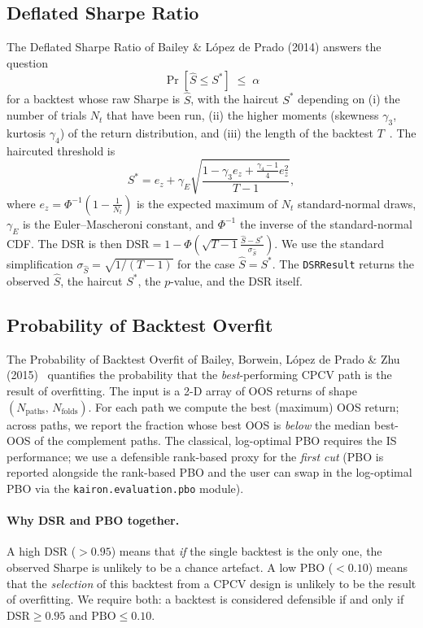 \documentclass[11pt,a4paper]{article}
\providecommand{\sharpehat}{\hat{S}}
\providecommand{\srmin}{S^{\ast}}
\begin{document}
\subsection{Deflated Sharpe Ratio}
The Deflated Sharpe Ratio of Bailey \& López de Prado (2014)
answers the question
\[
\Pr\!\left[\sharpehat \leq \srmin\right]\; \leq\; \alpha
\]
for a backtest whose raw Sharpe is $\sharpehat$, with the
haircut $\srmin$ depending on (i) the number of trials $N_t$
that have been run, (ii) the higher moments (skewness
$\gamma_3$, kurtosis $\gamma_4$) of the return
distribution, and (iii) the length of the backtest
$T$~\cite{bailey2014deflated}. The haircuted threshold is
\begin{equation}\label{eq:srstar}
\srmin = e_{z} + \gamma_E\sqrt{
\frac{
1 - \gamma_3 e_z + \frac{\gamma_4-1}{4}e_z^2
}{T-1}
},
\end{equation}
where $e_z = \Phi^{-1}\!\left(1-\frac{1}{N_t}\right)$ is the
expected maximum of $N_t$ standard-normal draws, $\gamma_E$
is the Euler--Mascheroni constant, and $\Phi^{-1}$ the
inverse of the standard-normal CDF. The DSR is then
$\mathrm{DSR} = 1 - \Phi\!\left(
\sqrt{T-1}\frac{\sharpehat - \srmin}{\sigma_{\sharpehat}}
\right)$. We use the standard simplification
$\sigma_{\sharpehat}=\sqrt{1/(T-1)}$ for the case
$\sharpehat=\srmin$. The \texttt{DSRResult} returns
the observed $\sharpehat$, the haircut $\srmin$, the
$p$-value, and the DSR itself.

\subsection{Probability of Backtest Overfit}
The Probability of Backtest Overfit of Bailey, Borwein,
López de Prado \& Zhu (2015)~\cite{bailey2015pbo} quantifies
the probability that the \emph{best}-performing CPCV path is
the result of overfitting. The input is a 2-D array of OOS
returns of shape \((N_{\mathrm{paths}},\,N_{\mathrm{folds}})\).
For each path we compute the best (maximum) OOS return;
across paths, we report the fraction whose best OOS is
\emph{below} the median best-OOS of the complement
paths. The classical, log-optimal PBO requires the IS
performance; we use a defensible rank-based proxy for the
\emph{first cut} (PBO is reported alongside the rank-based
PBO and the user can swap in the log-optimal PBO via the
\texttt{kairon.evaluation.pbo} module).

\paragraph{Why DSR and PBO together.}
A high DSR ($>0.95$) means that \emph{if} the
single backtest is the only one, the observed Sharpe is
unlikely to be a chance artefact. A low PBO ($<0.10$) means
that the \emph{selection} of this backtest from a CPCV
design is unlikely to be the result of overfitting. We
require both: a backtest is considered defensible if and
only if $\mathrm{DSR}\geq 0.95$ and $\mathrm{PBO}\leq 0.10$.
\end{document}
